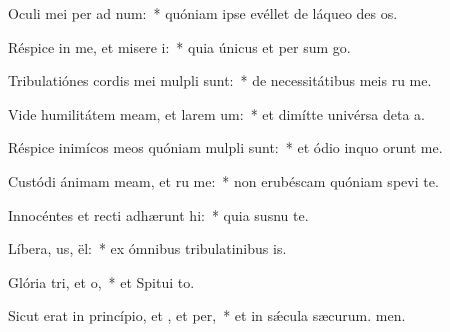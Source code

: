 \item Oculi mei per ad num:~* quóniam ipse evéllet de láqueo des os.
\item Réspice in me, et misere i:~* quia únicus et per sum go.
\item Tribulatiónes cordis mei mulpli sunt:~* de necessitátibus meis ru me.
\item Vide humilitátem meam, et larem um:~* et dimítte univérsa deta a.
\item Réspice inimícos meos quóniam mulpli sunt:~* et ódio inquo orunt me.
\item Custódi ánimam meam, et ru me:~* non erubéscam quóniam spevi  te.
\item Innocéntes et recti adhærunt hi:~* quia susnu te.
\item Líbera, us, ël:~* ex ómnibus tribulatinibus is.
\item Glória tri, et o,~* et Spitui to.
\item Sicut erat in princípio, et , et per,~* et in sǽcula sæcurum. men.
